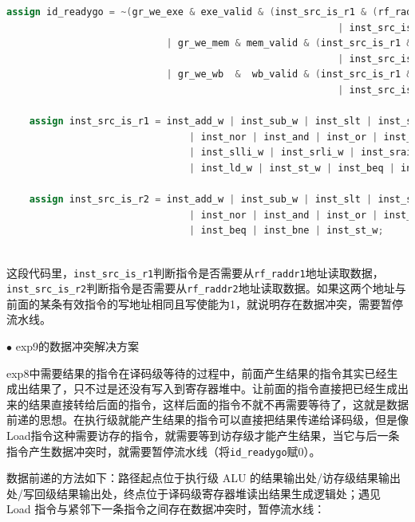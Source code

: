 \documentclass[UTF8]{report}
\begin{document}
\begin{lstlisting}[language=Verilog]
    assign id_readygo = ~(gr_we_exe & exe_valid & (inst_src_is_r1 & (rf_raddr1 == dest_exe) 
                                                          | inst_src_is_r2 & (rf_raddr2 == dest_exe))
                            | gr_we_mem & mem_valid & (inst_src_is_r1 & (rf_raddr1 == dest_mem) 
                                                          | inst_src_is_r2 & (rf_raddr2 == dest_mem))
                            | gr_we_wb  &  wb_valid & (inst_src_is_r1 & (rf_raddr1 == dest_wb)  
                                                          | inst_src_is_r2 & (rf_raddr2 == dest_wb)));

    assign inst_src_is_r1 = inst_add_w | inst_sub_w | inst_slt | inst_sltu 
                                | inst_nor | inst_and | inst_or | inst_xor
                                | inst_slli_w | inst_srli_w | inst_srai_w | inst_addi_w
                                | inst_ld_w | inst_st_w | inst_beq | inst_bne | inst_jirl;
                                    
    assign inst_src_is_r2 = inst_add_w | inst_sub_w | inst_slt | inst_sltu
                                | inst_nor | inst_and | inst_or | inst_xor
                                | inst_beq | inst_bne | inst_st_w;
                                    
\end{lstlisting}

这段代码里，\texttt{inst_src_is_r1}判断指令是否需要从\texttt{rf_raddr1}地址读取数据，\texttt{inst_src_is_r2}判断指令是否需要从\texttt{rf_raddr2}地址读取数据。如果这两个地址与前面的某条有效指令的写地址相同且写使能为1，就说明存在数据冲突，需要暂停流水线。

\noindent
$\bullet$ exp9的数据冲突解决方案

exp8中需要结果的指令在译码级等待的过程中，前面产生结果的指令其实已经生成出结果了，只不过是还没有写入到寄存器堆中。让前面的指令直接把已经生成出来的结果直接转给后面的指令，这样后面的指令不就不再需要等待了，这就是数据前递的思想。在执行级就能产生结果的指令可以直接把结果传递给译码级，但是像Load指令这种需要访存的指令，就需要等到访存级才能产生结果，当它与后一条指令产生数据冲突时，就需要暂停流水线（将\texttt{id\_readygo}赋0）。

数据前递的方法如下：路径起点位于执行级 ALU 的结果输出处/访存级结果输出处/写回级结果输出处，终点位于译码级寄存器堆读出结果生成逻辑处；遇见 Load 指令与紧邻下一条指令之间存在数据冲突时，暂停流水线：
\end{document}

